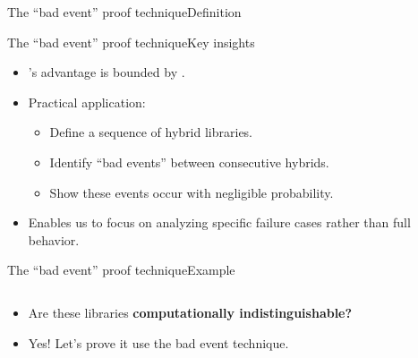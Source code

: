 \documentclass[aspectratio=169, lualatex, handout]{beamer}
\begin{document}
\begin{frame}{The ``bad event'' proof technique}{Definition}
\end{frame}

\begin{frame}{The ``bad event'' proof technique}{Key insights}
	\begin{itemize}[<+->]
		\item \prog{}'s advantage is bounded by .
		\item Practical application:
		      \begin{itemize}[<+->]
			      \item Define a sequence of hybrid libraries.
			      \item Identify ``bad events'' between consecutive hybrids.
			      \item Show these events occur with negligible probability.
		      \end{itemize}
		\item Enables us to focus on analyzing specific failure cases rather than full behavior.
	\end{itemize}
\end{frame}

\begin{frame}{The ``bad event'' proof technique}{Example}
	\begin{columns}[c]
		\begin{column}{0.5\textwidth}
			\begin{itemize}[<+->]
				\item Are these libraries \textbf{computationally indistinguishable?}
				\item Yes! Let's prove it use the bad event technique.
			\end{itemize}
		\end{column}
		\begin{column}{0.5\textwidth}
		\end{column}
	\end{columns}
\end{frame}
\end{document}
